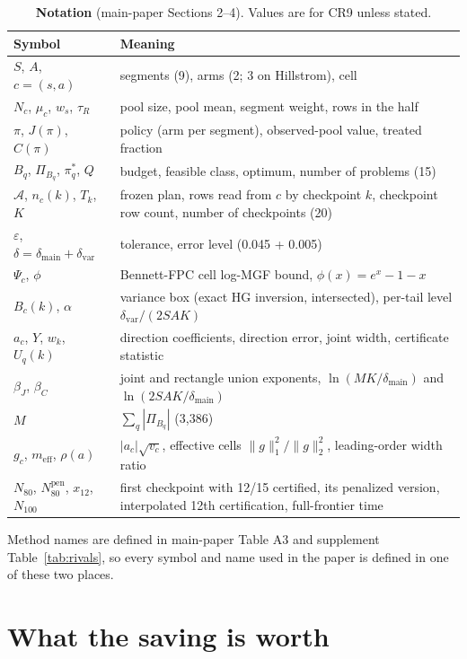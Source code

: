 \documentclass[sigconf,anonymous,review]{acmart}
\newcommand{\cA}{\mathcal{A}}
\newcommand{\eps}{\varepsilon}
\newcommand{\dmain}{\delta_{\text{main}}}
\newcommand{\dvar}{\delta_{\text{var}}}
\newcommand{\Npen}{N_{80}^{\text{pen}}}
\newcommand{\meff}{m_{\text{eff}}}
\begin{document}
\begin{table}[H]
\caption{\textbf{Notation} (main-paper Sections 2--4). Values are for CR9 unless stated.}
\label{tab:notation}
\footnotesize
\setlength{\tabcolsep}{3pt}
\begin{tabular}{@{}l>{\raggedright\arraybackslash}p{5.3cm}@{}}
\toprule
Symbol & Meaning \\
\midrule
$S$, $A$, $c = (s, a)$ & segments (9), arms (2; 3 on Hillstrom), cell \\
$N_c$, $\mu_c$, $w_s$, $\tau_R$ & pool size, pool mean, segment weight, rows in the half \\
$\pi$, $J(\pi)$, $C(\pi)$ & policy (arm per segment), observed-pool value, treated fraction \\
$B_q$, $\Pi_{B_q}$, $\pi^*_q$, $Q$ & budget, feasible class, optimum, number of problems (15) \\
$\cA$, $n_c(k)$, $T_k$, $K$ & frozen plan, rows read from $c$ by checkpoint $k$, checkpoint row count, number of checkpoints (20) \\
$\eps$, $\delta = \dmain + \dvar$ & tolerance, error level (0.045 + 0.005) \\
$\Psi_c$, $\phi$ & Bennett-FPC cell log-MGF bound, $\phi(x) = e^x - 1 - x$ \\
$B_c(k)$, $\alpha$ & variance box (exact HG inversion, intersected), per-tail level $\dvar/(2SAK)$ \\
$a_c$, $Y$, $w_k$, $U_q(k)$ & direction coefficients, direction error, joint width, certificate statistic \\
$\beta_J$, $\beta_C$ & joint and rectangle union exponents, $\ln(MK/\dmain)$ and $\ln(2SAK/\dmain)$ \\
$M$ & $\sum_q |\Pi_{B_q}|$ (3,386) \\
$g_c$, $\meff$, $\rho(a)$ & $|a_c|\sqrt{v_c}$, effective cells $\|g\|_1^2/\|g\|_2^2$, leading-order width ratio \\
$N_{80}$, $\Npen$, $x_{12}$, $N_{100}$ & first checkpoint with 12/15 certified, its penalized version, interpolated 12th certification, full-frontier time \\
\bottomrule
\end{tabular}
\end{table}

\noindent Method names are defined in main-paper Table A3 and supplement Table~\ref{tab:rivals}, so every symbol and name used in the paper is defined in one of these two places.

\section{What the saving is worth}\label{app:cost}
\end{document}
